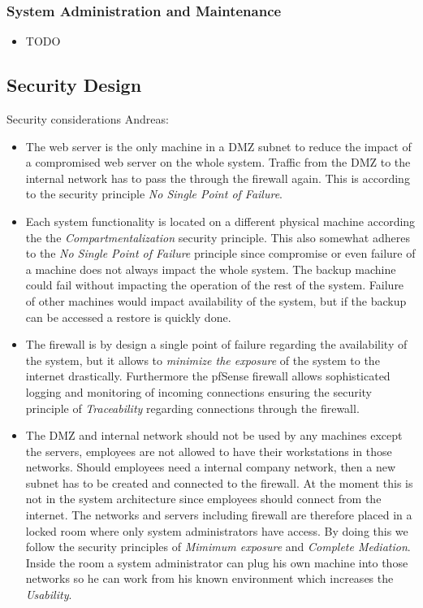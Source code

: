 \documentclass[english]{article}
\begin{document}
\subsubsection{System Administration and Maintenance}
\begin{itemize}
\item TODO
\end{itemize}

\subsection{Security Design}


Security considerations Andreas:
\begin{itemize}
    \item The web server is the only machine in a DMZ subnet to reduce the impact of a compromised web server on the whole system. Traffic from the DMZ to the internal network has to pass the through the firewall again. This is according to the security principle \emph{No Single Point of Failure}.
    \item Each system functionality is located on a different physical machine according the the \emph{Compartmentalization} security principle. This also somewhat adheres to the \emph{No Single Point of Failure} principle since compromise or even failure of a machine does not always impact the whole system. The backup machine could fail without impacting the operation of the rest of the system. Failure of other machines would impact availability of the system, but if the backup can be accessed a restore is quickly done.
    \item The firewall is by design a single point of failure regarding the availability of the system, but it allows to \emph{minimize the exposure} of the system to the internet drastically. Furthermore the pfSense firewall allows sophisticated logging and monitoring of incoming connections ensuring the security principle of \emph{Traceability} regarding connections through the firewall.
    \item The DMZ and internal network should not be used by any machines except the servers, employees are not allowed to have their workstations in those networks. Should employees need a internal company network, then a new subnet has to be created and connected to the firewall. At the moment this is not in the system architecture since employees should connect from the internet. The networks and servers including firewall are therefore placed in a locked room where only system administrators have access. By doing this we follow the security principles of \emph{Mimimum exposure} and \emph{Complete Mediation}. Inside the room a system administrator can plug his own machine into those networks so he can work from his known environment which increases the \emph{Usability}.

\end{itemize}
\end{document}
